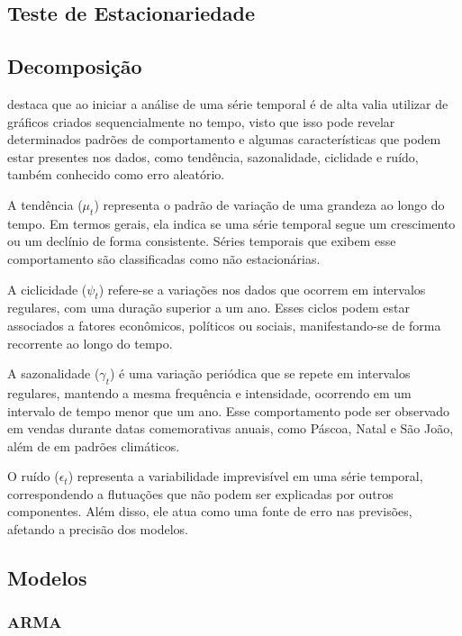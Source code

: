     \subsection{Teste de Estacionariedade}

    \subsection{Decomposição}

         destaca que ao iniciar a análise de uma série temporal é de alta valia utilizar de gráficos 
        criados sequencialmente no tempo, visto que isso pode revelar determinados padrões de comportamento e algumas 
        características que podem estar presentes nos dados, como tendência, sazonalidade, ciclidade e ruído, também 
        conhecido como erro aleatório. 
        
        A tendência ($\mu_t$) representa o padrão de variação de uma grandeza ao longo do tempo. Em termos gerais, ela indica se 
        uma série temporal segue um crescimento ou um declínio de forma consistente. Séries temporais que exibem esse comportamento 
        são classificadas como não estacionárias.

        
        A ciclicidade ($\psi_t$) refere-se a variações nos dados que ocorrem em intervalos regulares, com uma duração superior a um 
        ano. Esses ciclos podem estar associados a fatores econômicos, políticos ou sociais, manifestando-se de forma recorrente ao 
        longo do tempo.     
        
        A sazonalidade ($\gamma_t$) é uma variação periódica que se repete em intervalos regulares, mantendo a mesma frequência e 
        intensidade, ocorrendo em um intervalo de tempo menor que um ano. Esse comportamento pode ser observado em 
        vendas durante datas comemorativas anuais, como Páscoa, Natal e São João, além de em padrões climáticos.
        
        O ruído ($\epsilon_t$) representa a variabilidade imprevisível em uma série temporal, correspondendo a flutuações que não 
        podem ser explicadas por outros componentes. Além disso, ele atua como uma fonte de erro nas previsões, afetando a precisão 
        dos modelos.


    \subsection{Modelos}
        \subsubsection{ARMA}
